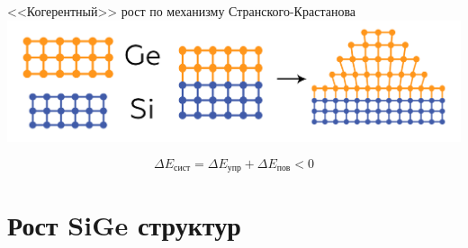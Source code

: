 \documentclass[10pt,pdf,hyperref={unicode}, dvipsnames]{beamer}
\begin{document}
\begin{frame}[t]
\begin{minipage}{0.84\linewidth}
		<<Когерентный>> рост по механизму Странского-Крастанова
		\includegraphics[width = \linewidth]{imgs/22st.png}

		$$ \Delta E_{\text{сист}} = \Delta E_{\text{упр}}+\Delta E_{\text{пов}} < 0$$
		
	\end{minipage}
	\vfill
\end{frame}

\section{Рост SiGe структур}
\end{document}
